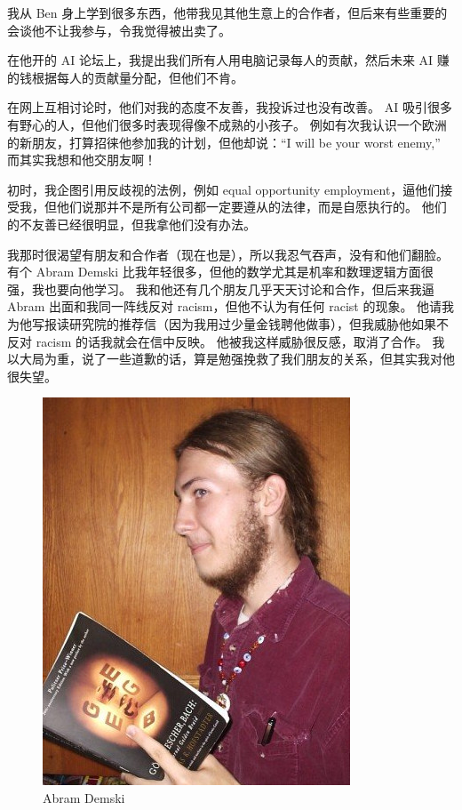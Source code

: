 \documentclass[12pt]{report}
\begin{document}
我从 Ben 身上学到很多东西，他带我见其他生意上的合作者，但后来有些重要的会谈他不让我参与，令我觉得被出卖了。

在他开的 AI 论坛上，我提出我们所有人用电脑记录每人的贡献，然后未来 AI 赚的钱根据每人的贡献量分配，但他们不肯。

在网上互相讨论时，他们对我的态度不友善，我投诉过也没有改善。  AI 吸引很多有野心的人，但他们很多时表现得像不成熟的小孩子。  例如有次我认识一个欧洲的新朋友，打算招徕他参加我的计划，但他却说：``I will be your worst enemy,'' 而其实我想和他交朋友啊！

初时，我企图引用反歧视的法例，例如 equal opportunity employment，逼他们接受我，但他们说那并不是所有公司都一定要遵从的法律，而是自愿执行的。 他们的不友善已经很明显，但我拿他们没有办法。

我那时很渴望有朋友和合作者（现在也是），所以我忍气吞声，没有和他们翻脸。 有个 Abram Demski 比我年轻很多，但他的数学尤其是机率和数理逻辑方面很强，我也要向他学习。 我和他还有几个朋友几乎天天讨论和合作，但后来我逼 Abram 出面和我同一阵线反对 racism，但他不认为有任何 racist 的现象。 他请我为他写报读研究院的推荐信（因为我用过少量金钱聘他做事），但我威胁他如果不反对 racism 的话我就会在信中反映。 他被我这样威胁很反感，取消了合作。 我以大局为重，说了一些道歉的话，算是勉强挽救了我们朋友的关系，但其实我对他很失望。

\begin{figure}[H]
\centering
\includegraphics[scale=0.4]{AbramDemski.jpg}
\caption*{Abram Demski}
\end{figure}
\end{document}
